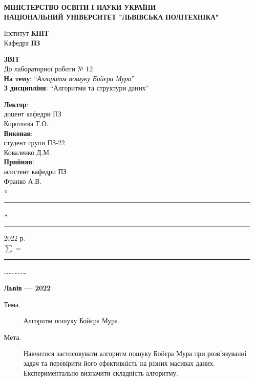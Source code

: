 \documentclass{article}
\newcommand\subject{Алгоритми та структури даних}
\newcommand\lecturer{доцент кафедри ПЗ\\Коротєєва Т.О.}
\newcommand\teacher{асистент кафедри ПЗ\\Франко А.В.}
\newcommand\mygroup{ПЗ-22}
\newcommand\lab{12}
\newcommand\theme{Алгоритм пошуку Бойєра Мура}
\newcommand\purpose{Навчитися застосовувати алгоритм пошуку Бойєра Мура при розв’язуванні задач та перевірити його ефективність на різних масивах даних. Експериментально визначити складність алгоритму}
\begin{document}
	\begin{normalsize}
		\begin{titlepage}
			\thispagestyle{empty}
			\begin{center}
				\textbf{МІНІСТЕРСТВО ОСВІТИ І НАУКИ УКРАЇНИ\\
					НАЦІОНАЛЬНИЙ УНІВЕРСИТЕТ "ЛЬВІВСЬКА ПОЛІТЕХНІКА"}
			\end{center}
			\begin{flushright}
				Інститут \textbf{КНІТ}\\
				Кафедра \textbf{ПЗ}
			\end{flushright}
			\vspace{200pt}
			\begin{center}
				\textbf{ЗВІТ}\\
				\vspace{10pt}
				До лабораторної роботи № \lab\\
				\textbf{На тему}: “\textit{\theme}”\\
				\textbf{З дисципліни}: “\subject”
			\end{center}
			\vspace{112pt}
			\begin{flushright}
				
				\textbf{Лектор}:\\
				\lecturer\\
				\vspace{28pt}
				\textbf{Виконав}:\\
				
				студент групи \mygroup\\
				Коваленко Д.М.\\
				\vspace{28pt}
				\textbf{Прийняв}:\\
				
				\teacher\\
				
				\vspace{28pt}
				«\rule{1cm}{0.15mm}» \rule{1.5cm}{0.15mm} 2022 р.\\
				$\sum$ = \rule{1cm}{0.15mm}……………\\
				
			\end{flushright}
			\vspace{\fill}
			\begin{center}
				\textbf{Львів — 2022}
			\end{center}
		\end{titlepage}
		
		\begin{description}
			\item[Тема.] \theme.
			\item[Мета.] \purpose.
		\end{description}
		

\end{normalsize}
\end{document}
